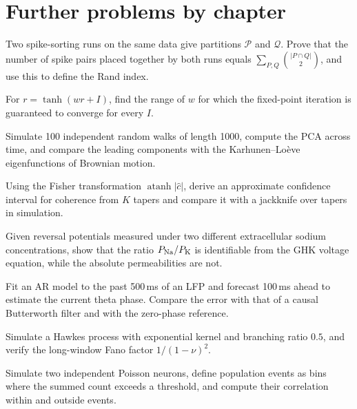 \section{Further problems by chapter}
\begin{exercise}
Two spike-sorting runs on the same data give partitions $\mathcal P$ and
$\mathcal Q$. Prove that the number of spike pairs placed together by
both runs equals $\sum_{P,Q}\binom{|P\cap Q|}{2}$, and use this to define
the Rand index.
\end{exercise}
\begin{exercise}
For $r=\tanh(wr+I)$, find the range of $w$ for which the fixed-point
iteration is guaranteed to converge for every $I$.
\end{exercise}
\begin{exercise}
Simulate 100 independent random walks of length 1000, compute the PCA
across time, and compare the leading components with the
Karhunen--Lo\`eve eigenfunctions of Brownian motion.
\end{exercise}
\begin{exercise}
Using the Fisher transformation $\operatorname{atanh}|\hat c|$, derive an
approximate confidence interval for coherence from $K$ tapers and
compare it with a jackknife over tapers in simulation.
\end{exercise}
\begin{exercise}
Given reversal potentials measured under two different extracellular
sodium concentrations, show that the ratio $P_{\rm Na}/P_{\rm K}$ is
identifiable from the GHK voltage equation, while the absolute
permeabilities are not.
\end{exercise}
\begin{exercise}
Fit an AR model to the past 500\,ms of an LFP and forecast 100\,ms ahead
to estimate the current theta phase. Compare the error with that of a
causal Butterworth filter and with the zero-phase reference.
\end{exercise}
\begin{exercise}
Simulate a Hawkes process with exponential kernel and branching ratio
$0.5$, and verify the long-window Fano factor $1/(1-\nu)^2$.
\end{exercise}
\begin{exercise}
Simulate two independent Poisson neurons, define population events as
bins where the summed count exceeds a threshold, and compute their
correlation within and outside events.
\end{exercise}
